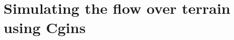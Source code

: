 \documentclass[11pt]{article}
\begin{document}


\newcommand{\Gt}{\Gc_{t}}
\section{Simulating the flow over terrain using Cgins}\label{sec:terrain}
\end{document}
